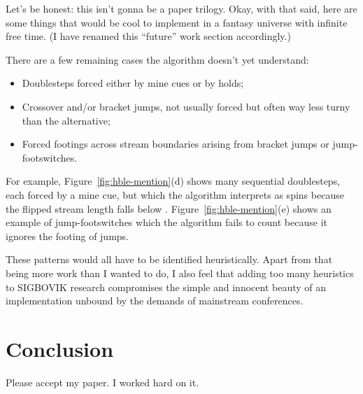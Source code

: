 \documentclass[10pt]{sigplanconf}
\begin{document}
Let's be honest: this isn't gonna be a paper trilogy.
Okay, with that said, here are some things that would be cool to implement in a fantasy universe with infinite free time.
(I have renamed this ``future'' work section accordingly.)

There are a few remaining cases the algorithm doesn't yet understand:
\begin{itemize}
	\item Doublesteps forced either by mine cues or by holds;
	\item Crossover and/or bracket jumps, not usually forced but often way less turny than the alternative;
	\item Forced footings across stream boundaries arising from bracket jumps or jump-footswitches.
\end{itemize}
For example, Figure~\ref{fig:hble-mention}(d) shows many sequential doublesteps, each forced by a mine cue,
but which the algorithm interprets as spins because the flipped stream length falls below \nflip.
Figure~\ref{fig:hble-mention}(e) shows an example of jump-footswitches
which the algorithm fails to count because it ignores the footing of jumps.

These patterns would all have to be identified heuristically.
Apart from that being more work than I wanted to do,
I also feel that adding too many heuristics to SIGBOVIK research
compromises the simple and innocent beauty of an implementation unbound by the demands of mainstream conferences.

\section{Conclusion}

Please accept my paper.
I worked hard on it.




\end{document}
